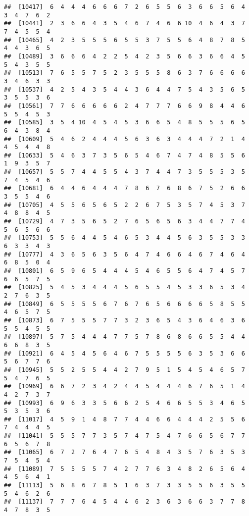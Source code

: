 \documentclass[
]{book}
\begin{document}
\begin{verbatim}
##  [10417]  6  4  4  4  6  6  6  7  2  6  5  5  6  3  6  6  5  6  4  3  4  7  6  2
##  [10441]  2  3  6  6  4  3  5  4  6  7  4  6  6 10  4  6  4  3  7  7  4  5  5  4
##  [10465]  4  2  3  5  5  5  6  5  5  3  7  5  5  6  4  8  7  8  5  4  4  3  6  5
##  [10489]  3  6  6  6  4  2  2  5  4  2  3  5  6  6  3  6  6  4  5  5  4  3  5  5
##  [10513]  7  6  5  5  7  5  2  3  5  5  5  8  6  3  7  6  6  6  6  3  4  6  3  3
##  [10537]  4  2  5  4  3  5  4  4  3  6  4  4  7  5  4  3  5  6  5  3  5  5  3  6
##  [10561]  7  7  6  6  6  6  6  2  4  7  7  7  6  6  9  8  4  4  6  5  5  4  5  3
##  [10585]  3  5  4 10  4  5  4  5  3  6  6  5  4  8  5  5  5  6  5  6  4  3  8  4
##  [10609]  5  4  6  2  4  4  4  5  6  3  6  3  4  4  4  7  2  1  4  4  5  4  4  8
##  [10633]  5  4  6  3  7  3  5  6  5  4  6  7  4  7  4  8  5  5  6  1  9  3  5  7
##  [10657]  5  5  7  4  4  5  5  4  3  7  4  4  7  3  5  5  5  3  5  7  4  5  4  6
##  [10681]  6  4  4  6  4  4  4  7  8  6  7  6  8  6  7  5  2  6  6  3  5  5  4  6
##  [10705]  4  5  5  6  5  6  5  2  2  6  7  5  3  5  7  4  5  3  7  4  8  8  4  5
##  [10729]  4  7  3  5  6  5  2  7  6  5  6  5  6  3  4  4  7  7  4  5  6  5  6  6
##  [10753]  5  5  6  4  4  5  4  6  5  3  4  4  5  6  3  5  5  3  3  6  3  3  4  3
##  [10777]  4  3  6  5  6  3  5  6  4  7  4  6  6  4  6  7  4  6  4  6  8  5  0  4
##  [10801]  6  5  9  6  5  4  4  4  5  4  6  5  5  6  4  7  4  5  7  6  6  5  7  5
##  [10825]  5  4  5  3  4  4  4  5  6  5  5  4  5  3  3  6  5  3  4  2  7  6  3  5
##  [10849]  6  5  5  5  5  6  7  6  7  6  5  6  6  6  6  5  8  5  5  4  6  5  7  5
##  [10873]  6  7  5  5  5  7  7  3  2  3  6  5  4  3  6  4  6  3  6  5  5  4  5  5
##  [10897]  5  7  5  4  4  4  7  7  5  7  8  6  8  6  6  5  5  4  4  6  6  8  3  5
##  [10921]  6  4  5  4  5  6  4  6  7  5  5  5  5  6  3  5  3  6  6  5  6  7  7  6
##  [10945]  5  5  2  5  5  4  4  2  7  9  5  1  5  4  5  4  6  5  7  5  4  7  6  5
##  [10969]  6  6  7  2  3  4  2  4  4  5  4  4  4  6  7  6  5  1  4  4  2  7  3  7
##  [10993]  6  9  6  3  3  5  6  6  2  5  4  6  6  5  5  3  4  6  5  5  3  5  3  6
##  [11017]  4  5  9  1  4  8  7  7  4  4  6  6  4  4  4  2  5  5  6  7  4  4  4  5
##  [11041]  5  5  5  7  7  3  5  7  4  7  5  4  7  6  6  5  6  7  7  6  5  6  7  8
##  [11065]  6  7  2  7  6  4  7  6  5  4  8  4  3  5  7  6  3  5  3  7  5  4  5  4
##  [11089]  7  5  5  5  5  7  4  2  7  7  6  3  4  8  2  6  5  6  4  4  5  6  4  1
##  [11113]  5  6  8  6  7  8  5  1  6  3  7  3  3  5  5  6  3  5  5  5  4  6  2  6
##  [11137]  7  7  7  6  4  5  4  4  6  2  3  6  3  6  6  3  7  7  8  4  7  8  3  5

\end{verbatim}
\end{document}
